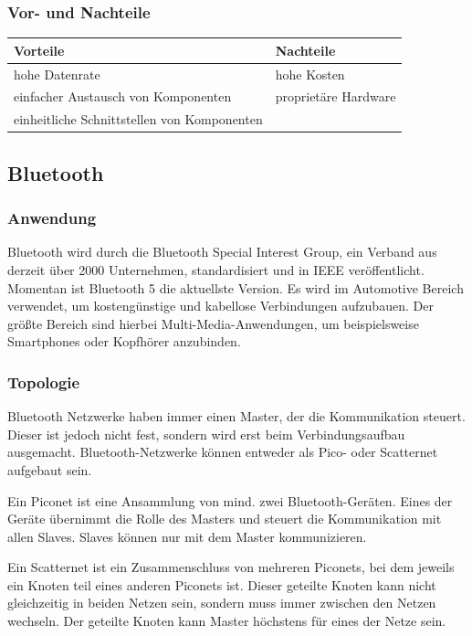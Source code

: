     \subsubsection{Vor- und Nachteile}
    \begin{center}
    \begin{tabular}{l|l}
        \textbf{Vorteile} & \textbf{Nachteile}\\
        \hline hohe Datenrate & hohe Kosten\\
        \hline einfacher Austausch von Komponenten & proprietäre Hardware\\
        \hline einheitliche Schnittstellen von Komponenten &\\
    \end{tabular}
    \end{center}
    
    \subsection{Bluetooth}		
    \subsubsection{Anwendung}
    Bluetooth wird durch die Bluetooth Special Interest Group, ein Verband aus derzeit über 2000 Unternehmen, standardisiert und in IEEE veröffentlicht. 
    Momentan ist Bluetooth 5 die aktuellste Version. Es wird im Automotive Bereich verwendet, um kostengünstige und kabellose Verbindungen aufzubauen. 
    Der größte Bereich sind hierbei Multi-Media-Anwendungen, um beispielsweise Smartphones oder Kopfhörer anzubinden. \cite{BP01} \cite{.MH_Blue2} 
    
    \subsubsection{Topologie}
    Bluetooth Netzwerke haben immer einen Master, der die Kommunikation steuert. Dieser ist jedoch nicht fest, sondern wird erst beim Verbindungsaufbau ausgemacht.
    Bluetooth-Netzwerke können entweder als Pico- oder Scatternet aufgebaut sein.
                                                                                      
    Ein Piconet ist eine Ansammlung von mind. zwei Bluetooth-Geräten. Eines der Geräte übernimmt die Rolle des Masters und steuert die Kommunikation mit allen Slaves. Slaves können nur mit dem Master kommunizieren.
    
    Ein Scatternet ist ein Zusammenschluss von mehreren Piconets, bei dem jeweils ein Knoten teil eines anderen Piconets ist. Dieser geteilte Knoten kann nicht gleichzeitig in beiden Netzen sein, sondern muss immer zwischen den Netzen wechseln. Der geteilte Knoten kann Master höchstens für eines der Netze sein.
    \cite{.MH_Blue2}
    
